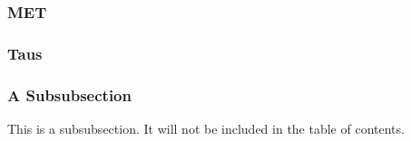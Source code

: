 \subsubsection{MET} \label{sec:MET} 

\subsubsection{Taus} \label{sec:taus} 


\subsubsection{A Subsubsection} \label{sec:example_subsubsection} 

This is a subsubsection. It will not be included in the table of contents. 

